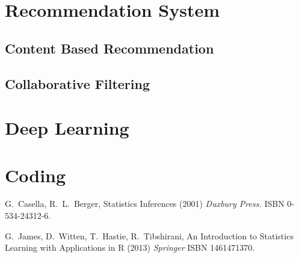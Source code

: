 \documentclass[12pt]{amsart}
\numberwithin{equation}{section}
\theoremstyle{plain}
\theoremstyle{definition}
\begin{document}
\section{Recommendation System}

\subsection{Content Based Recommendation}

\subsection{Collaborative Filtering}

\section{Deep Learning}


\section{Coding}


\begin{thebibliography}{}
G.~Casella, R.~L.~Berger,
\newblock Statistics Inferences
\newblock (2001) {\em Duxbury Press.} ISBN 0-534-24312-6.

G.~James, D.~Witten, T.~Hastie, R.~Tibshirani,
\newblock An Introduction to Statistics Learning with Applications in R
\newblock (2013) {\em Springer} ISBN 1461471370.

\end{thebibliography}
\end{document}
